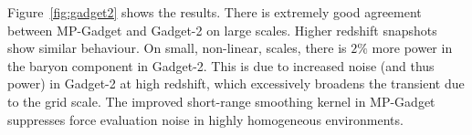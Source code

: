 \documentclass[a4paper,11pt]{article}
\begin{document}
Figure~\ref{fig:gadget2} shows the results. There is extremely good agreement between MP-Gadget and Gadget-2 on large scales.  Higher redshift snapshots show similar behaviour. On small, non-linear, scales, there is $2\%$ more power in the baryon component in Gadget-2. This is due to increased noise (and thus power) in Gadget-2 at high redshift, which excessively broadens the transient due to the grid scale. The improved short-range smoothing kernel in MP-Gadget suppresses force evaluation noise in highly homogeneous environments.



\end{document}
